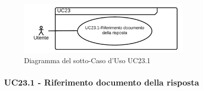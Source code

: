\documentclass[10pt, a4paper]{article}
\begin{document}
    \begin{figure}[h]
        \centering
        \includegraphics[width=0.75\textwidth, height=0.75\textheight, keepaspectratio]{UC-images/UC23.1.png}
        \caption{Diagramma del sotto-Caso d'Uso UC23.1}
    \end{figure}

    \subsubsection{UC23.1 - Riferimento documento della risposta}
\end{document}
